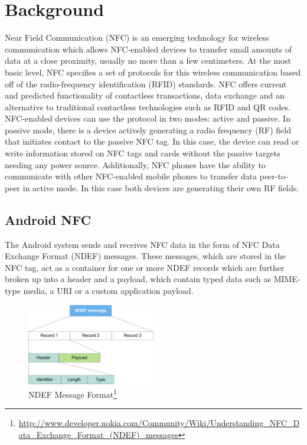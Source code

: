 \documentclass[12pt]{article}
\begin{document}
\section{Background}
Near Field Communication (NFC) is an emerging technology for wireless communication which allows NFC-enabled devices to transfer small amounts of data at a close proximity, usually no more than a few centimeters.
At the most basic level, NFC specifies a set of protocols for this wireless communication based off of the radio-frequency identification (RFID) standards.
NFC offers current and predicted functionality of contactless transactions, data exchange and an alternative to traditional contactless technologies such as RFID and QR codes.
NFC-enabled devices can use the protocol in two modes: active and passive.
In passive mode, there is a device actively generating a radio frequency (RF) field that initiates contact to the passive NFC tag.
In this case, the device can read or write information stored on NFC tags and cards without the passive targets needing any power source.
Additionally, NFC phones have the ability to communicate with other NFC-enabled mobile phones to transfer data peer-to-peer in active mode.
In this case both devices are generating their own RF fields.

\subsection{Android NFC}

The Android system sends and receives NFC data in the form of NFC Data Exchange Format (NDEF) messages.
These messages, which are stored in the NFC tag, act as a container for one or more NDEF records which are further broken up into a header and a payload, which contain typed data such as MIME-type media, a URI or a custom application payload.

\begin{figure}[h!]
\begin{minipage}{\textwidth}
	\centering
		\includegraphics[width=0.5\textwidth]{NDEF_Format.png}
	\caption[Caption for LOF]%
		{NDEF Message Format\footnote{\url{http://www.developer.nokia.com/Community/Wiki/Understanding_NFC_Data_Exchange_Format_(NDEF)_messages}}}

\end{minipage} 
\end{figure}
\end{document}
